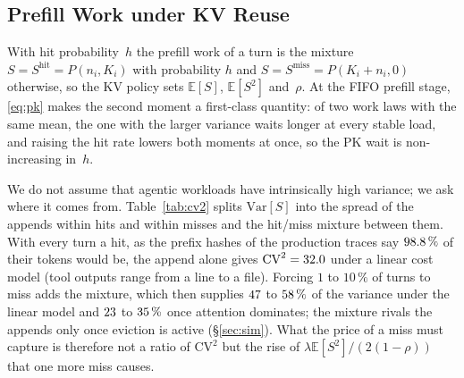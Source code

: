 \documentclass{article}
\newcommand{\leanref}[1]{}
\newcommand{\provedby}[1]{}
\theoremstyle{plain}
\theoremstyle{definition}
\theoremstyle{remark}
\newcommand{\E}{\mathbb{E}}
\begin{document}
\subsection{Prefill Work under KV Reuse}\label{sec:congestion}

With hit probability~$h$ the prefill work of a turn is the mixture
$S=S^{\mathrm{hit}}=P(n_i,K_i)$ with probability $h$ and
$S=S^{\mathrm{miss}}=P(K_i+n_i,0)$ otherwise, so the KV policy sets
$\E[S]$, $\E[S^2]$ and~$\rho$. At the FIFO prefill stage,
\eqref{eq:pk} makes the second moment a first-class quantity: of two
work laws with the same mean, the one with the larger variance waits
longer at every stable load,\provedby{\leanref{pkWait\_lt\_of\_variance\_lt}}
and raising the hit rate lowers both moments at once, so the PK wait is
non-increasing in~$h$.\provedby{\leanref{meanService\_antitone}, \leanref{utilization\_antitone}, \leanref{secondMomentService\_antitone}, \leanref{pkWait\_mixture\_antitone}}

\begin{table}[t]
\caption{Where the variance of prefill work comes from, on
\wkRequests{} production Claude Code requests (\S\ref{sec:exp-traces}).
Work is~\eqref{eq:prefill} with the crossover context $K_c=a/b$ at
which the attention term equals the dense term ($K_c=\infty$: the
linear model). Miss/hit: mean miss work over mean hit work. All hit:
$\mathrm{CV}^2$ of the work when every turn hits as the prefix hashes
say it would. Then the
$\mathrm{CV}^2$ of the hit/miss mixture at hit rate $h$, with the share
of $\mathrm{Var}[S]$ that the mixture contributes in parentheses; the
rest is the spread of the appends.}
\label{tab:cv2}
\centering\footnotesize

\end{table}

We do not assume that agentic workloads have intrinsically high
variance; we ask where it comes from. Table~\ref{tab:cv2} splits
$\mathrm{Var}[S]$ into the spread of the appends within hits and within
misses and the hit/miss mixture between them. With every turn a hit,
as the prefix hashes of the production traces say $98.8\,\%$ of
their tokens would be, the append alone gives $\mathrm{CV}^2=32.0$
under a linear cost model (tool outputs range from a line to a file).
Forcing $1$ to
$10\,\%$ of turns to miss adds the mixture, which then supplies
$47$ to $58\,\%$ of the variance under the linear
model and $23$ to $35\,\%$ once attention
dominates; the mixture rivals the appends only once eviction is active
(\S\ref{sec:sim}). What the price of a miss must capture is therefore not a ratio of
$\mathrm{CV}^2$ but the rise of $\lambda\E[S^2]/(2(1-\rho))$ that one
more miss causes.
\end{document}
